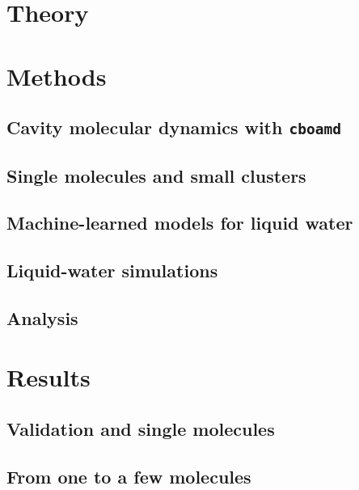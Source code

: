 \documentclass[aps,prb,reprint,superscriptaddress,nofootinbib,floatfix]{revtex4-2}
\begin{document}
\section{Theory}
\label{sec:theory}

\section{Methods}
\label{sec:methods}

\subsection{Cavity molecular dynamics with \texttt{cboamd}}

\subsection{Single molecules and small clusters}

\subsection{Machine-learned models for liquid water}

\subsection{Liquid-water simulations}

\subsection{Analysis}

\section{Results}

\subsection{Validation and single molecules}
\label{sec:single}

\subsection{From one to a few molecules}
\label{sec:few}
\end{document}
